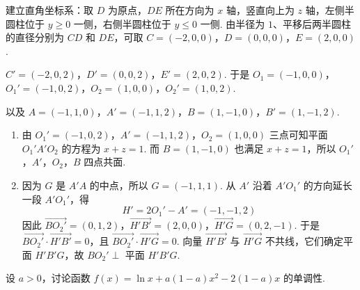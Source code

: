 \begin{solution}
建立直角坐标系：取 \(D\) 为原点，\(DE\) 所在方向为 \(x\) 轴，竖直向上为 \(z\) 轴，左侧半圆柱位于 \(y\geqslant0\) 一侧，右侧半圆柱位于 \(y\leqslant0\) 一侧. 由半径为 \(1\)、平移后两半圆柱的直径分别为 \(CD\) 和 \(DE\)，可取
\(C=(-2,0,0)\)，\(D=(0,0,0)\)，\(E=(2,0,0)\).

\(C'=(-2,0,2)\)，\(D'=(0,0,2)\)，\(E'=(2,0,2)\).
于是 \(O_1=(-1,0,0)\)，\(O_1'=(-1,0,2)\)，\(O_2=(1,0,0)\)，\(O_2'=(1,0,2)\).

以及 \(A=(-1,1,0)\)，\(A'=(-1,1,2)\)，\(B=(1,-1,0)\)，\(B'=(1,-1,2)\).

\begin{enumerate}
\item 由 \(O_1'=(-1,0,2)\)，\(A'=(-1,1,2)\)，\(O_2=(1,0,0)\) 三点可知平面 \(O_1'A'O_2\) 的方程为 \(x+z=1\). 而 \(B=(1,-1,0)\) 也满足 \(x+z=1\)，所以 \(O_1'\)，\(A'\)，\(O_2\)，\(B\) 四点共面.
\item 因为 \(G\) 是 \(A'A\) 的中点，所以 \(G=(-1,1,1)\). 从 \(A'\) 沿着 \(A'O_1'\) 的方向延长一段 \(A'O_1'\)，得
\[
H'=2O_1'-A'=(-1,-1,2)
\]
因此 \(\overrightarrow{BO_2'}=(0,1,2)\)，\(\overrightarrow{H'B'}=(2,0,0)\)，\(\overrightarrow{H'G}=(0,2,-1)\).
于是 \(\overrightarrow{BO_2'}\cdot\overrightarrow{H'B'}=0\)，且 \(\overrightarrow{BO_2'}\cdot\overrightarrow{H'G}=0\). 向量 \(\overrightarrow{H'B'}\) 与 \(\overrightarrow{H'G}\) 不共线，它们确定平面 \(H'B'G\)，故 \(BO_2'\perp\) 平面 \(H'B'G\).
\end{enumerate}
\end{solution}

\begin{problem}
设 \(a > 0\)，讨论函数 \(f(x) = \ln x + a(1 - a)x^2 - 2(1 - a)x\) 的单调性.
\end{problem}

